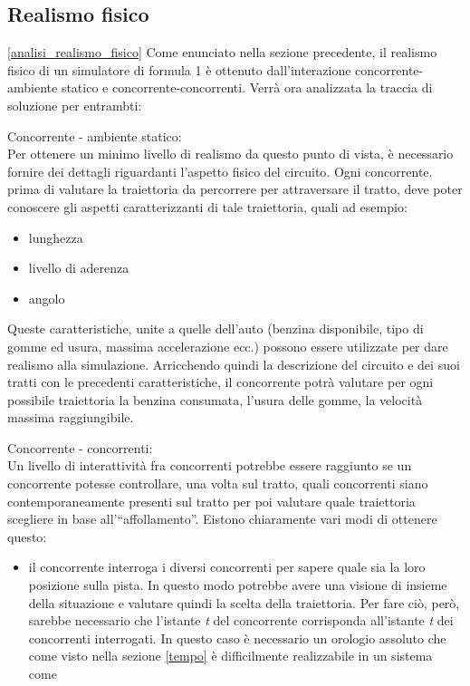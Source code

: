 \subsection{Realismo fisico}
\ref{analisi_realismo_fisico}
Come enunciato nella sezione precedente, il realismo fisico di un simulatore di formula 1 è ottenuto dall'interazione
concorrente-ambiente statico e concorrente-concorrenti. Verrà ora analizzata la traccia di soluzione per entrambti:
\begin{description}
\item{Concorrente - ambiente statico:}\\
Per ottenere un minimo livello di realismo da questo punto di vista, è necessario fornire dei dettagli riguardanti l'aspetto fisico
del circuito. Ogni concorrente. prima di valutare la traiettoria da percorrere per attraversare il tratto, deve poter conoscere
gli aspetti caratterizzanti di tale traiettoria, quali ad esempio:
\begin{itemize}
\item lunghezza 
\item livello di aderenza
\item angolo
\end{itemize}
Queste caratteristiche, unite a quelle dell'auto (benzina disponibile, tipo di gomme ed usura, massima accelerazione ecc.)
possono essere utilizzate per dare realismo alla simulazione.
Arricchendo quindi la descrizione del circuito e dei suoi tratti con le precedenti caratteristiche, il concorrente potrà
valutare per ogni possibile traiettoria la benzina consumata, l'usura delle gomme, la velocità massima raggiungibile.
\item{Concorrente - concorrenti:}\\
Un livello di interattività fra concorrenti potrebbe essere raggiunto se 
un concorrente potesse controllare, una volta sul tratto, quali concorrenti siano contemporaneamente presenti sul tratto
per poi valutare quale traiettoria scegliere in base all'``affollamento''. Eistono chiaramente vari modi di ottenere questo:
\begin{itemize}
\item il concorrente interroga i diversi concorrenti per sapere quale sia la loro posizione sulla pista. In questo modo potrebbe
avere una visione di insieme della situazione e valutare quindi la scelta della traiettoria. Per fare ciò, però, sarebbe 
necessario che l'istante \emph{t} del concorrente corrisponda all'istante \emph{t} dei concorrenti interrogati. In questo caso
è necessario un orologio assoluto che come visto nella sezione \ref{tempo} è difficilmente realizzabile in un sistema come

\end{itemize}
\end{description}
